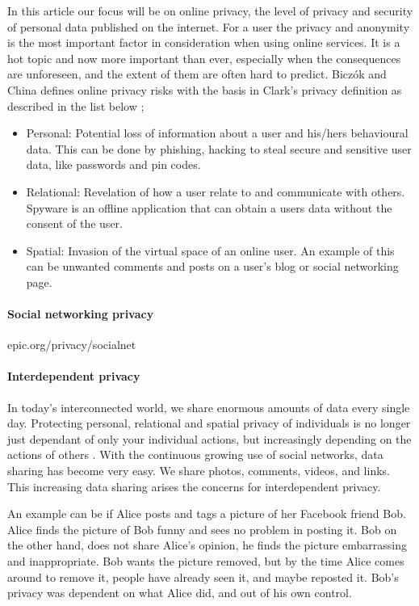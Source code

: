 In this article our focus will be on online privacy, the level of privacy and security of personal data published on the internet. For a user the privacy and anonymity is the most important factor in consideration when using online services. It is a hot topic and now more important than ever, especially when the consequences are unforeseen, and the extent of them are often hard to predict. Biczók and China defines online privacy risks with the basis in Clark's privacy definition as described in the list below \cite{InterdependetPriv};

\begin{itemize} 
\item Personal: Potential loss of information about a user and his/hers behavioural data. This can be done by phishing, hacking to steal secure and sensitive user data, like passwords and pin codes.
\item Relational: Revelation of how a user relate to and communicate with others. Spyware is an offline application that can obtain a users data without the consent of the user. 
\item Spatial: Invasion of  the virtual space of an online user. An example of this can be unwanted comments and posts on a user's blog or social networking page.
\end{itemize}

\paragraph{Social networking privacy}
epic.org/privacy/socialnet

\paragraph{Interdependent privacy}
In today's interconnected world, we share enormous amounts of data every single day. Protecting personal, relational and spatial privacy of individuals is no longer just dependant of only your individual actions, but increasingly depending on the actions of others \cite{InterdependetPriv}. With the continuous growing use of social networks, data sharing has become very easy. We share photos, comments, videos, and links. This increasing data sharing arises the concerns for interdependent privacy. 
 
An example can be if Alice posts and tags a picture of her Facebook friend Bob. Alice finds the picture of Bob funny and sees no problem in posting it. Bob on the other hand, does not share Alice's opinion, he finds the picture embarrassing and inappropriate. Bob wants the picture removed, but by the time Alice comes around to remove it, people have already seen it, and maybe reposted it. Bob's privacy was dependent on what Alice did, and out of his own control. 
 

